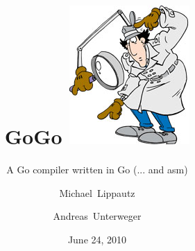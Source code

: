 \documentclass{beamer}
\begin{document}
\title{\hspace{1.8cm}\textbf{GoGo} \includegraphics[scale=0.3]{files/inspector.jpg}}
\subtitle{A Go compiler written in Go \tiny{(... and asm)}}
\author{Michael~Lippautz \and Andreas~Unterweger} 
\date{June 24, 2010} 

\frame{\titlepage} 

\end{document}
